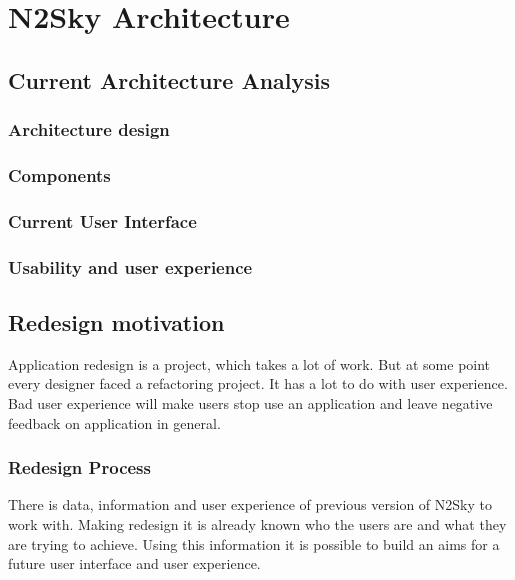 \section{N2Sky Architecture}\label{TheN2SkyArchitecture}

\subsection{Current Architecture Analysis}\label{CurrentArchitectureAnalysis}
\subsubsection{Architecture design}\label{Architecturedesign}
\subsubsection{Components}\label{Components}
\subsubsection{Current User Interface}\label{CurrentUserInterface}
\subsubsection{Usability and user experience}\label{Usabilityanduserexperience}



\subsection{Redesign motivation}\label{Redesignmotivation}

Application redesign is a project, which takes a lot of work. But at some point every designer faced a refactoring project. It has a lot to do with user experience. Bad user experience will make users stop use an application and leave negative feedback on application in general. 

\subsubsection{Redesign Process }\label{Redesign Process}

There is data, information and user experience of previous version of N2Sky to work with. Making redesign it is already known who the users are and what they are trying to achieve.  Using this information it is possible to build an aims for a future user interface and user experience.



